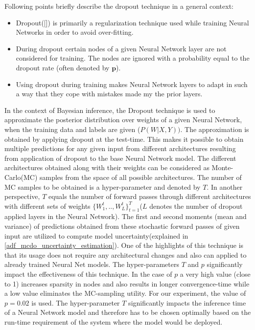 	Following points briefly describe the dropout technique in a general context:
	\begin{itemize}
		\item Dropout([]) is primarily a regularization technique used while training Neural Networks in order to avoid over-fitting.
		\item During dropout certain nodes of a given Neural Network layer are not considered for training. The nodes are ignored with a probability equal to the dropout rate (often denoted by $\textbf{p}$).
		\item Using dropout during training makes Neural Network layers to adapt in such a way that they cope with mistakes made my the prior layers. 
		
	\end{itemize}
	
	In the context of Bayesian inference, the Dropout technique is used to approximate the posterior distribution over weights of a given Neural Network, when the training data and labels are given ($P(W|X,Y))$. The approximation is obtained by applying dropout at the test-time. This makes it possible to obtain multiple predictions for any given input from different architectures resulting from application of dropout to the base Neural Network model. The different architectures obtained along with their weights can be considered as Monte-Carlo(MC) samples from the space of all possible architectures. The number of MC samples to be obtained is a hyper-parameter and denoted by $T$. In another perspective, $T$ equals the number of forward passes through different architectures with different sets of weights $\{W_{1}^t,..,W_{L}^t\}_{t=1}^T$($L$ denotes the number of dropout applied layers in the Neural Network). The first and second moments (mean and variance) of predictions obtained from these stochastic forward passes of given input are utilized to compute model uncertainty(explained in  \ref{adf_mcdo_uncertainty_estimation}). One of the highlights of this technique is that its usage does not require any architectural changes and also can applied to already trained Neural Net models. The hyper-parameters $T$ and $p$ significantly impact the effectiveness of this technique. In the case of $p$ a very high value (close to 1) increases sparsity in nodes and also results in longer convergence-time while a low value eliminates the MC-sampling utility. For our experiment, the value of $p=0.02$ is used. The hyper-parameter $T$ significantly impacts the inference time of a Neural Network model and therefore has to be chosen optimally based on the run-time requirement of the system where the model would be deployed.
	
